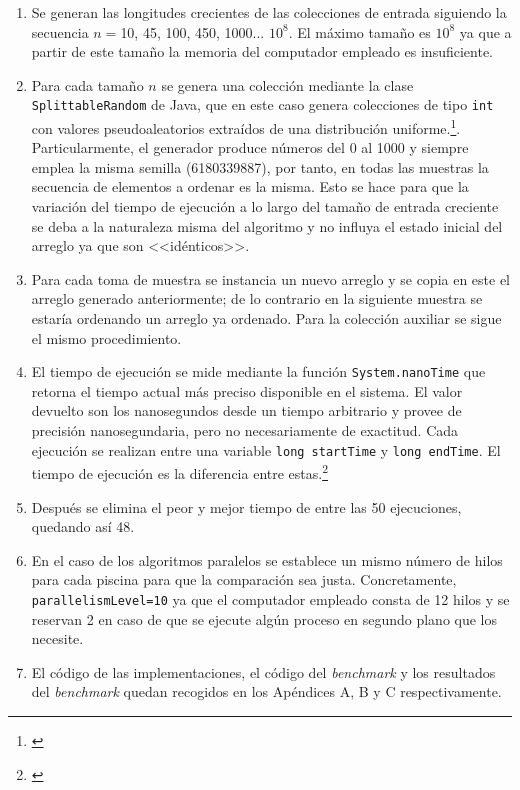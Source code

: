 \documentclass[titlepage]{article}
\begin{document}
\begin{enumerate}
	\item Se generan las longitudes crecientes de las colecciones de entrada siguiendo la secuencia $n=$10, 45, 100, 450, 1000... $10^8$. El máximo tamaño es $10^8$ ya que a partir de este tamaño la memoria del computador empleado es insuficiente.
	\item Para cada tamaño $n$ se genera una colección mediante la clase \lstinline|SplittableRandom| de Java, que en este caso genera colecciones de tipo \lstinline|int| con valores pseudoaleatorios extraídos de una distribución uniforme.\footnote{\cite{OracleSplittableRandom}}. Particularmente, el generador produce números del 0 al 1000 y siempre emplea la misma semilla (6180339887), por tanto, en todas las muestras la secuencia de elementos a ordenar es la misma. Esto se hace para que la variación del tiempo de ejecución a lo largo del tamaño de entrada creciente se deba a la naturaleza misma del algoritmo y no influya el estado inicial del arreglo ya que son <<idénticos>>.
	\item Para cada toma de muestra se instancia un nuevo arreglo y se copia en este el arreglo generado anteriormente; de lo contrario en la siguiente muestra se estaría ordenando un arreglo ya ordenado. Para la colección auxiliar se sigue el mismo procedimiento.
	\item El tiempo de ejecución se mide mediante la función \lstinline|System.nanoTime| que retorna el tiempo actual más preciso disponible en el sistema. El valor devuelto son los nanosegundos desde un tiempo arbitrario y provee de precisión nanosegundaria, pero no necesariamente de exactitud. Cada ejecución se realizan entre una variable \lstinline|long startTime| y \lstinline|long endTime|. El tiempo de ejecución es la diferencia entre estas.\footnote{\cite{OracleSystem}}
	\item Después se elimina el peor y mejor tiempo de entre las 50 ejecuciones, quedando así 48.
	\item En el caso de los algoritmos paralelos se establece un mismo número de hilos para cada piscina para que la comparación sea justa. Concretamente, \lstinline|parallelismLevel=10| ya que el computador empleado consta de 12 hilos y se reservan 2 en caso de que se ejecute algún proceso en segundo plano que los necesite. 
	\item El código de las implementaciones, el código del \textit{benchmark} y los resultados del \textit{benchmark} quedan recogidos en los Apéndices A, B y C respectivamente.
	
\end{enumerate}
\end{document}
